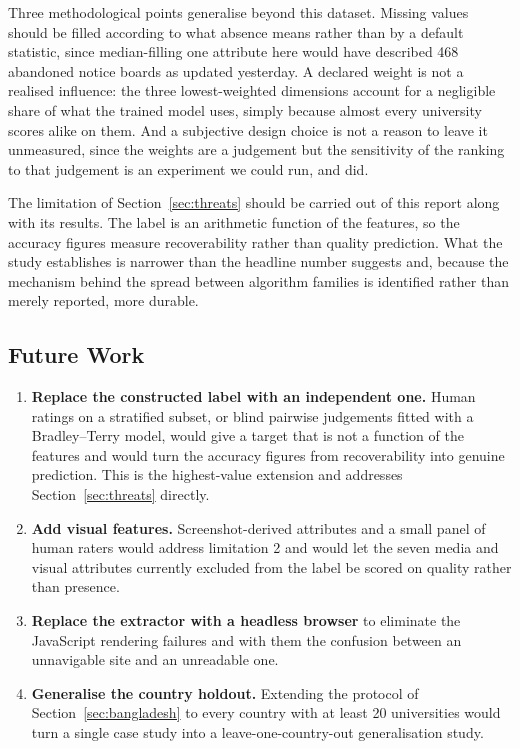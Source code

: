 \documentclass[11pt,a4paper]{article}
\begin{document}
Three methodological points generalise beyond this dataset. Missing values should be filled according
to what absence means rather than by a default statistic, since median-filling one attribute here
would have described 468 abandoned notice boards as updated yesterday. A declared weight is not a
realised influence: the three lowest-weighted dimensions account for a negligible share of what the
trained model uses, simply because almost every university scores alike on them. And a subjective
design choice is not a reason to leave it unmeasured, since the weights are a judgement but the
sensitivity of the ranking to that judgement is an experiment we could run, and did.

The limitation of Section~\ref{sec:threats} should be carried out of this report along with its
results. The label is an arithmetic function of the features, so the accuracy figures measure
recoverability rather than quality prediction. What the study establishes is narrower than the
headline number suggests and, because the mechanism behind the spread between algorithm families is
identified rather than merely reported, more durable.

\subsection{Future Work}
\label{sec:future}

\begin{enumerate}
\item \textbf{Replace the constructed label with an independent one.} Human ratings on a stratified
subset, or blind pairwise judgements fitted with a Bradley--Terry model, would give a target that is
not a function of the features and would turn the accuracy figures from recoverability into genuine
prediction. This is the highest-value extension and addresses Section~\ref{sec:threats} directly.
\item \textbf{Add visual features.} Screenshot-derived attributes and a small panel of human raters
would address limitation 2 and would let the seven media and visual attributes currently excluded from
the label be scored on quality rather than presence.
\item \textbf{Replace the extractor with a headless browser} to eliminate the JavaScript rendering
failures and with them the confusion between an unnavigable site and an unreadable one.
\item \textbf{Generalise the country holdout.} Extending the protocol of Section~\ref{sec:bangladesh}
to every country with at least 20 universities would turn a single case study into a
leave-one-country-out generalisation study.
\end{enumerate}
\end{document}
